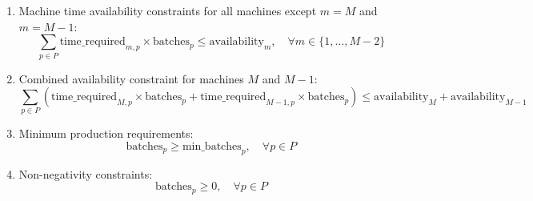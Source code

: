 \documentclass{article}
\begin{document}
\begin{enumerate}
    \item Machine time availability constraints for all machines except \( m = M \) and \( m = M-1 \):
    \[
    \sum_{p \in P} \text{time\_required}_{m,p} \times \text{batches}_{p} \leq \text{availability}_{m}, \quad \forall m \in \{1, \ldots, M-2\}
    \]

    \item Combined availability constraint for machines \( M \) and \( M-1 \):
    \[
    \sum_{p \in P} \left( \text{time\_required}_{M,p} \times \text{batches}_{p} + \text{time\_required}_{M-1,p} \times \text{batches}_{p} \right) \leq \text{availability}_{M} + \text{availability}_{M-1}
    \]

    \item Minimum production requirements:
    \[
    \text{batches}_{p} \geq \text{min\_batches}_{p}, \quad \forall p \in P
    \]

    \item Non-negativity constraints:
    \[
    \text{batches}_{p} \geq 0, \quad \forall p \in P
    \]
\end{enumerate}
\end{document}
